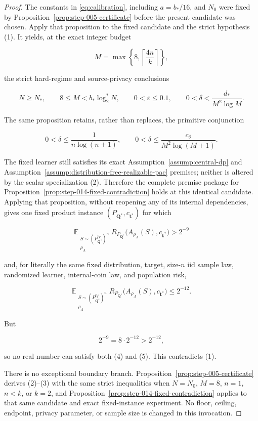 \begin{proof}
The constants in \eqref{eq:calibration}, including \(a=b_*/16\), and
\(N_0\) were fixed by
Proposition~\ref{prop:step-005-certificate} before the present
candidate was chosen. Apply that proposition to the fixed candidate and the
strict hypothesis (1). It yields, at the exact integer budget

\[
M=\max\left\{8,\left\lceil\frac{4n}{k}\right\rceil\right\},
\]

the strict hard-regime and source-privacy conclusions

\[
N\ge N_*,\qquad 8\le M<b_*\log_2^*N,
\qquad 0<\varepsilon\le0.1,
\qquad 0<\delta<\frac{d_*}{M^2\log M}.
\tag{2}
\]

The same proposition retains, rather than replaces, the primitive
conjunction

\[
0<\delta\le\frac{1}{n\log(n+1)},
\qquad
0<\delta\le\frac{c_\delta}{M^2\log(M+1)}.
\tag{3}
\]

The fixed learner still satisfies its exact
Assumption~\ref{assump:central-dp} and
Assumption~\ref{assump:distribution-free-realizable-pac} premises; neither
is altered by the scalar specialization (2). Therefore the complete
premise package for
Proposition~\ref{prop:step-014-fixed-contradiction} holds at this identical
candidate. Applying that proposition, without reopening any of its internal
dependencies, gives one fixed product instance
\((P_{\boldsymbol Q^*},c_{\boldsymbol t^*})\) for which

\[
\mathbb E_{\substack{
 S\sim(P_{\boldsymbol Q^*}^{c_{\boldsymbol t^*}})^n\\
 \rho_A}}
R_{P_{\boldsymbol Q^*}}
\bigl(A_{\rho_A}(S),c_{\boldsymbol t^*}\bigr)>2^{-9}
\tag{4}
\]

and, for literally the same fixed distribution, target, size-\(n\) iid
sample law, randomized learner, internal-coin law, and population risk,

\[
\mathbb E_{\substack{
 S\sim(P_{\boldsymbol Q^*}^{c_{\boldsymbol t^*}})^n\\
 \rho_A}}
R_{P_{\boldsymbol Q^*}}
\bigl(A_{\rho_A}(S),c_{\boldsymbol t^*}\bigr)\le2^{-12}.
\tag{5}
\]

But

\[
2^{-9}=8\cdot2^{-12}>2^{-12},
\tag{6}
\]

so no real number can satisfy both (4) and (5). This contradicts (1).

There is no exceptional boundary branch. Proposition~\ref{prop:step-005-certificate} derives (2)--(3) with the same
strict inequalities when \(N=N_0\), \(M=8\), \(n=1\), \(n<k\), or
\(k=2\), and Proposition~\ref{prop:step-014-fixed-contradiction} applies to that same
candidate and exact fixed-instance experiment. No floor, ceiling, endpoint,
privacy parameter, or sample size is changed in this invocation. \end{proof}

